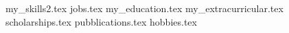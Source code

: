 \documentclass[11pt, a4paper]{awesome-cv}
\newcommand*{\sectiondir}{cv/}
\begin{document}
\makecvheader

{my_skills2.tex}
{jobs.tex}
{my_education.tex}
{my_extracurricular.tex}
{scholarships.tex}
{pubblications.tex}
{hobbies.tex}
\end{document}
